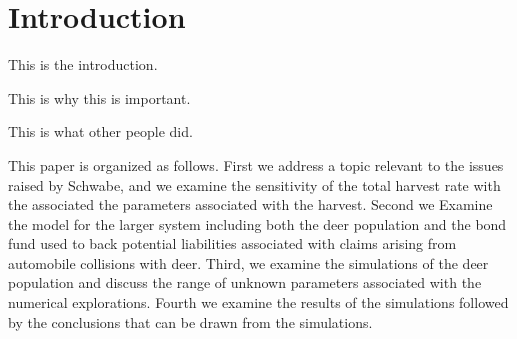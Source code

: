 

\section{Introduction}

This is the introduction. 

This is why this is important.

This is what other people did.

This paper is organized as follows. First we address a topic relevant
to the issues raised by Schwabe, and we examine the sensitivity of the
total harvest rate with the associated the parameters associated with
the harvest. Second we Examine the model for the larger system
including both the deer population and the bond fund used to back
potential liabilities associated with claims arising from automobile
collisions with deer. Third, we examine the simulations of the deer
population and discuss the range of unknown parameters associated with
the numerical explorations. Fourth we examine the results of the
simulations followed by the conclusions that can be drawn from the
simulations.

